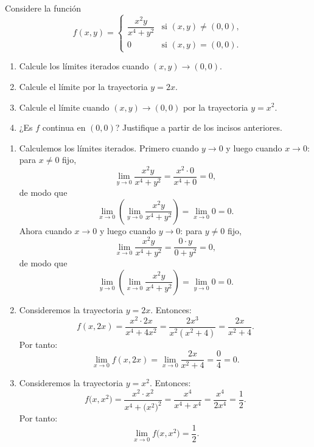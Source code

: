 \documentclass[10pt,a5]{aleph-examen}
\begin{document}
\begin{preguntas}

\item
Considere la función
\[
    f(x,y) = \begin{cases}
        \dfrac{x^2 y}{x^4 + y^2} & \text{si } (x,y)\neq(0,0),\\[6pt]
        0 & \text{si } (x,y)=(0,0).
    \end{cases}
\]
\begin{enumerate}[leftmargin=*]
    \item Calcule los límites iterados cuando $(x,y)\to(0,0)$.
    \item Calcule el límite por la trayectoria $y=2x$.
    \item Calcule el límite cuando $(x,y)\to(0,0)$ por la trayectoria $y=x^2$.
    \item ¿Es $f$ continua en $(0,0)$? Justifique a partir de los incisos anteriores.
\end{enumerate}


\begin{respuesta}
\begin{enumerate}
    \item Calculemos los límites iterados. Primero cuando $y\to 0$ y luego cuando $x\to 0$: para $x\neq 0$ fijo,
    \[
        \lim_{y\to 0}\frac{x^2 y}{x^4+y^2}
        =
        \frac{x^2\cdot 0}{x^4+0}
        =
        0,
    \]
    de modo que
    \[
        \lim_{x\to 0}\left(\lim_{y\to 0}\frac{x^2 y}{x^4+y^2}\right)
        =
        \lim_{x\to 0} 0
        =
        0.
    \]
    Ahora cuando $x\to 0$ y luego cuando $y\to 0$: para $y\neq 0$ fijo,
    \[
        \lim_{x\to 0}\frac{x^2 y}{x^4+y^2}
        =
        \frac{0\cdot y}{0+y^2}
        =
        0,
    \]
    de modo que
    \[
        \lim_{y\to 0}\left(\lim_{x\to 0}\frac{x^2 y}{x^4+y^2}\right)
        =
        \lim_{y\to 0} 0
        =
        0.
    \]

    \item Consideremos la trayectoria $y=2x$. Entonces:
    \[
        f(x,2x)
        =
        \frac{x^2\cdot 2x}{x^4+4x^2}
        =
        \frac{2x^3}{x^2(x^2+4)}
        =
        \frac{2x}{x^2+4}.
    \]
    Por tanto:
    \[
        \lim_{x\to 0} f(x,2x)
        =
        \lim_{x\to 0}\frac{2x}{x^2+4}
        =
        \frac{0}{4}
        =
        0.
    \]

    \item Consideremos la trayectoria $y=x^2$. Entonces:
    \[
        f\bigl(x,x^2\bigr)
        =
        \frac{x^2\cdot x^2}{x^4+\bigl(x^2\bigr)^2}
        =
        \frac{x^4}{x^4+x^4}
        =
        \frac{x^4}{2x^4}
        =
        \frac{1}{2}.
    \]
    Por tanto:
    \[
        \lim_{x\to 0} f\bigl(x,x^2\bigr)
        =
        \frac{1}{2}.
    \]


\end{enumerate}
\end{respuesta}
\end{preguntas}
\end{document}
